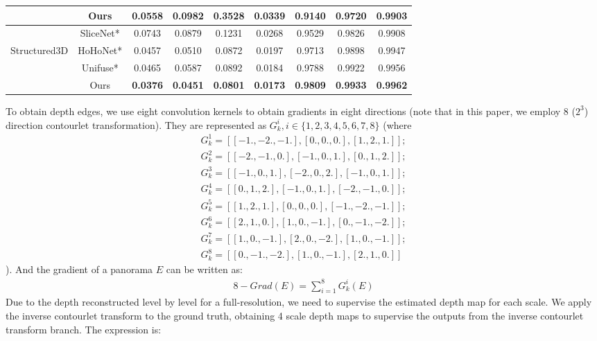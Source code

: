 \documentclass[10pt,times,mathptm,psfig,twocolumn,journals]{IEEEtran}
\begin{document}
\begin{table*}[t]
\begin{center}
\begin{tabular}{ccccccccc}
&Ours   & \textbf{0.0558}  & \textbf{0.0982} & \textbf{0.3528} & \textbf{0.0339} & \textbf{0.9140} & \textbf{0.9720} & \textbf{0.9903}    \\
\hline
\noalign{\smallskip}
\hline
&SliceNet*\cite{Pintore_2021_CVPR}       & 0.0743  & 0.0879 & 0.1231 & 0.0268 & 0.9529 &0.9826 &0.9908     \\
Structured3D&HoHoNet*\cite{sun2021hohonet} & 0.0457  & 0.0510 & 0.0872 & 0.0197 & 0.9713 & 0.9898 & 0.9947\\
&Unifuse*\cite{Jiang_2021} & 0.0465  & 0.0587 & 0.0892 & 0.0184 & 0.9788 & 0.9922 & 0.9956      \\
&Ours   & \textbf{0.0376}  & \textbf{0.0451} & \textbf{0.0801} & \textbf{0.0173} & \textbf{0.9809} & \textbf{0.9933} & \textbf{0.9962}    \\
\hline
\end{tabular}
\end{center}
\end{table*}

To obtain depth edges, we use eight convolution kernels to obtain gradients in eight directions (note that in this paper, we employ 8 ($2^{3}$)  direction contourlet transformation). They are represented as $G_{k}^{i}, i \in \{1, 2, 3, 4, 5, 6, 7, 8\}$ (where\begin{eqnarray}
G_{k}^{1} = [[-1., -2., -1.], [0., 0., 0.], [1., 2., 1.]]; \\G_{k}^{2} = [[-2., -1., 0.], [-1., 0., 1.], [0., 1., 2.]]; \\G_{k}^{3} = [[-1., 0., 1.], [-2., 0., 2.], [-1., 0., 1.]]; \\G_{k}^{4} = [[0., 1., 2.], [-1., 0., 1.], [-2., -1., 0.]]; \\G_{k}^{5} = [[1., 2., 1.], [0., 0., 0.], [-1., -2., -1.]]; \\G_{k}^{6} = [[2., 1., 0.], [1., 0., -1.], [0., -1., -2.]]; \\G_{k}^{7} = [[1., 0., -1.], [2., 0., -2.], [1., 0., -1.]]; \\G_{k}^{8} = [[0., -1., -2.], [1., 0., -1.], [2., 1., 0.]]
\end{eqnarray}). And the gradient of a panorama $E$ can be written as:
\begin{eqnarray}
8-Grad(E) = \sum_{i=1}^{8} G_{k}^{i}(E)
\end{eqnarray}
Due to the depth reconstructed level by level for a full-resolution, we need to supervise the estimated depth map for each scale. We apply the inverse contourlet transform to the ground truth, obtaining 4 scale depth maps to supervise the outputs from the inverse contourlet transform branch. The expression is:
\end{document}
